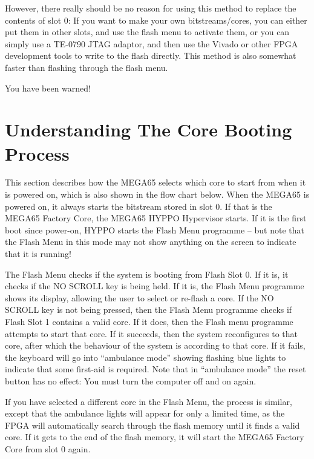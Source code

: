 However, there really should be no reason for using this method to replace the contents of slot 0:
If you want to make your own bitstreams/cores, you can either put them in other slots, and use the
flash menu to activate them, or you can simply use a TE-0790 JTAG adaptor, and then use
the Vivado or other FPGA development tools to write to the flash directly. This method is also
somewhat faster than flashing through the flash menu.

You have been warned!

\section{Understanding The Core Booting Process}

This section describes how the MEGA65 selects which core to start from when it is powered on,
which is also shown in the flow chart below. When the MEGA65 is
powered on, it always starts the bitstream stored in slot 0.
If that is the MEGA65 Factory Core, the MEGA65 HYPPO
Hypervisor starts.  If it is the first boot since power-on, HYPPO
starts the Flash Menu programme -- but note that the Flash Menu in
this mode may not show anything on the screen to indicate that it is
running!

The Flash Menu checks if the system is booting from Flash
Slot 0.  If it is, it checks if the NO SCROLL key is being held.  If
it is, the Flash Menu programme shows its display, allowing the user
to select or re-flash a core. If the NO SCROLL key is not being
pressed, then the Flash Menu programme checks if Flash Slot 1 contains a valid
core.  If it does, then the Flash menu programme attempts to start
that core.  If it succeeds, then the system reconfigures to that core,
after which the behaviour of the system is according to that core. If
it fails, the keyboard will go into ``ambulance mode'' showing flashing blue
lights to indicate that some first-aid is required.  Note that in ``ambulance
mode'' the reset button has no effect: You must turn the computer off
and on again.

If you have selected a different core in the Flash Menu, the process
is similar, except that the ambulance lights will appear for only a
limited time, as the FPGA will automatically search through the flash
memory until it finds a valid core. If it gets to the end of the flash
memory, it will start the MEGA65 Factory Core from slot 0 again.

